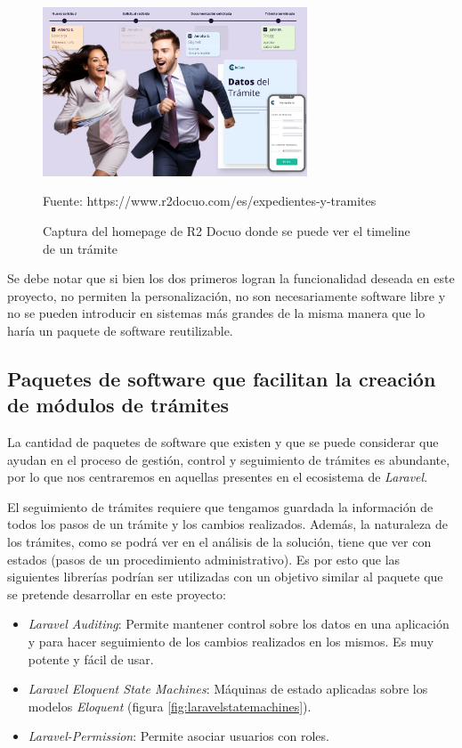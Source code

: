 \begin{figure}[!htpb]
    \centering
    \includegraphics[width=0.7\textwidth]{assets/r2docuotimeline}
    \caption{Captura del homepage de R2 Docuo donde se puede ver el timeline de un trámite}{Fuente: https://www.r2docuo.com/es/expedientes-y-tramites}
    \label{fig:r2docuotimeline}
\end{figure}

Se debe notar que si bien los dos primeros logran la funcionalidad deseada en este proyecto, no permiten la personalización, no son necesariamente software libre y no se pueden introducir en sistemas más grandes de la misma manera que lo haría un paquete de software reutilizable.

\subsection{Paquetes de software que facilitan la creación de módulos de trámites}

La cantidad de paquetes de software que existen y que se puede considerar que ayudan en el proceso de gestión, control y seguimiento de trámites es abundante, por lo que nos centraremos en aquellas presentes en el ecosistema de \textit{Laravel}.

El seguimiento de trámites requiere que tengamos guardada la información de todos los pasos de un trámite y los cambios realizados. Además, la naturaleza de los trámites, como se podrá ver en el análisis de la solución, tiene que ver con estados (pasos de un procedimiento administrativo). Es por esto que las siguientes librerías podrían ser utilizadas con un objetivo similar al paquete que se pretende desarrollar en este proyecto:

\begin{itemize}
    \item \textit{Laravel Auditing}: Permite mantener control sobre los datos en una aplicación y para hacer seguimiento de los cambios realizados en los mismos. Es muy potente y fácil de usar.
    \item \textit{Laravel Eloquent State Machines}: Máquinas de estado aplicadas sobre los modelos \textit{Eloquent} (figura \ref{fig:laravelstatemachines}).
    \item \textit{Laravel-Permission}: Permite asociar usuarios con roles.
\end{itemize}

